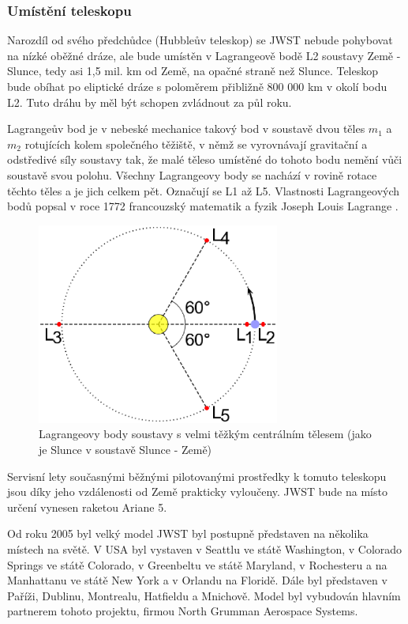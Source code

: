 \documentclass[a4paper,11pt]{article}
\begin{document}
\subsubsection{Umístění teleskopu}
Narozdíl od svého předchůdce (Hubbleův teleskop) se JWST nebude pohybovat na nízké oběžné dráze, ale bude umístěn v Lagrangeově bodě L2 soustavy Země - Slunce, tedy asi 1,5 mil. km od Země, na opačné straně než Slunce. Teleskop bude obíhat po eliptické dráze s poloměrem přibližně 800 000 km v okolí bodu L2. Tuto dráhu by měl být schopen zvládnout za půl roku.

Lagrangeův bod je v nebeské mechanice takový bod v soustavě dvou těles \begin{math}m_1\end{math} a \begin{math}m_2\end{math} rotujících kolem společného těžiště, v němž se vyrovnávají gravitační a odstředivé síly soustavy tak, že malé těleso umístěné do tohoto bodu nemění vůči soustavě svou polohu. Všechny Lagrangeovy body se nachází v rovině rotace těchto těles a je jich celkem pět. Označují se L1 až L5. Vlastnosti Lagrangeových bodů popsal v roce 1772 francouzský matematik a fyzik Joseph Louis Lagrange \cite{lagrange}.
\begin{figure}[h]
\begin{center}
\includegraphics[width=8cm]{lagrange.eps}
\caption{Lagrangeovy body soustavy s velmi těžkým centrálním tělesem (jako je Slunce v soustavě Slunce - Země)}
\end{center}
\end{figure}

Servisní lety současnými běžnými pilotovanými prostředky k tomuto teleskopu jsou díky jeho vzdálenosti od Země prakticky vyloučeny. JWST bude na místo určení vynesen raketou Ariane 5.

Od roku 2005 byl velký model JWST byl postupně představen na několika místech na světě. V USA byl vystaven v Seattlu ve státě Washington, v Colorado Springs ve státě Colorado, v Greenbeltu ve státě Maryland, v Rochesteru a na Manhattanu ve státě New York a v Orlandu na Floridě. Dále byl představen v Paříži, Dublinu, Montrealu, Hatfieldu a Mnichově. Model byl vybudován hlavním partnerem tohoto projektu, firmou North Grumman Aerospace Systems.
\end{document}

